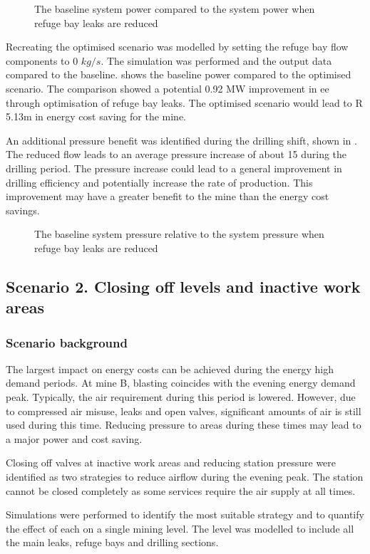 	\par 
	\begin{figure}[h!]
		\centering
		
		\caption{The baseline system power compared to the system power when refuge bay leaks are reduced}
		\label{fig: RefugeBay Power.}
	\end{figure} 
	Recreating the optimised scenario was modelled by setting the refuge bay flow components to 0 $kg/s$. The simulation was performed and the output data compared to the baseline.  shows the baseline power compared to the optimised scenario. The comparison showed a potential 0.92 MW improvement in \gls{ee} through optimisation of refuge bay leaks. The optimised scenario would lead to R 5.13m in energy cost saving for the mine.
	\par
	An additional pressure benefit was identified during the drilling shift, shown in . The reduced flow leads to an average pressure increase of about 15  during the drilling period. The pressure increase could lead to a general improvement in drilling efficiency and potentially increase the rate of production. This improvement may have a greater benefit to the mine than the energy cost savings.
	\begin{figure}[h!]
		\centering
		
		\caption{The baseline system pressure relative to the system pressure when refuge bay leaks are reduced}
		\label{fig: RefugeBay Pressures.}
	\end{figure} 
	\subsection{Scenario 2. Closing off levels and inactive work areas}
	\subsubsection{Scenario background}
	The largest impact on energy costs can be achieved during the energy high demand periods. At mine B, blasting coincides with the evening energy demand peak. Typically, the air requirement during this period is lowered. However, due to compressed air misuse, leaks and open valves, significant amounts of air is still used during this time. Reducing pressure to areas during these times may lead to a major power and cost saving. 
	\par 
	Closing off valves at inactive work areas and reducing station pressure were identified as two strategies to reduce airflow during the evening peak. The station cannot be closed completely as some services require the air supply at all times. 
	\par 
	Simulations were performed to identify the most suitable strategy and to quantify the effect of each on a single mining level. The level was modelled to include all the main leaks, refuge bays and drilling sections.  
